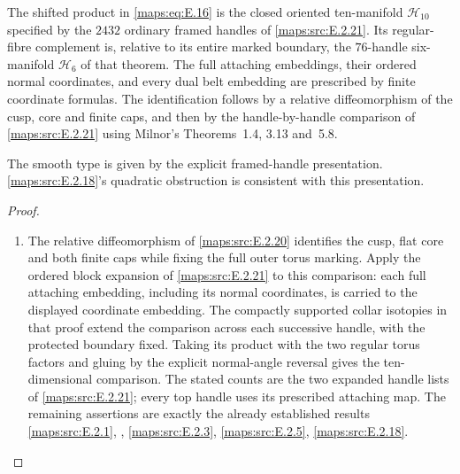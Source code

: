 \begin{proposition}\hypertarget{tag-02MO}{}\label{maps:src:E.2.4}


The shifted product in \eqref{maps:eq:E.16} is the closed oriented ten-manifold
$\mathcal H_{10}$ specified by the $2432$ ordinary framed handles
of \ref{maps:src:E.2.21}. Its regular-fibre complement is, relative to its entire
marked boundary, the $76$-handle six-manifold $\mathcal H_6$ of
that theorem. The full attaching embeddings, their ordered normal
coordinates, and every dual belt embedding are prescribed by
finite coordinate formulas. The identification follows by a
relative diffeomorphism of the cusp, core and finite caps,
and then by the handle-by-handle comparison of \ref{maps:src:E.2.21} using
Milnor's Theorems~1.4, 3.13 and~5.8. 

The smooth type is given by the explicit framed-handle presentation. \ref{maps:src:E.2.18}'s quadratic obstruction is consistent
with this presentation. 


\end{proposition}
\begin{proof}
\begin{enumerate}[label=\arabic*.,leftmargin=*]
\item The relative diffeomorphism of \cref{maps:src:E.2.20} identifies the cusp, flat core and both finite caps while fixing the full outer torus marking. Apply the ordered block expansion of \cref{maps:src:E.2.21} to this comparison: each full attaching embedding, including its normal coordinates, is carried to the displayed coordinate embedding. The compactly supported collar isotopies in that proof extend the comparison across each successive handle, with the protected boundary fixed. Taking its product with the two regular torus factors and gluing by the explicit normal-angle reversal gives the ten-dimensional comparison. The stated counts are the two expanded handle lists of \cref{maps:src:E.2.21}; every top handle uses its prescribed attaching map. The remaining assertions are exactly the already established results \cref{maps:src:E.2.1}, , \cref{maps:src:E.2.3}, \cref{maps:src:E.2.5}, \cref{maps:src:E.2.18}.
\end{enumerate}
\end{proof}